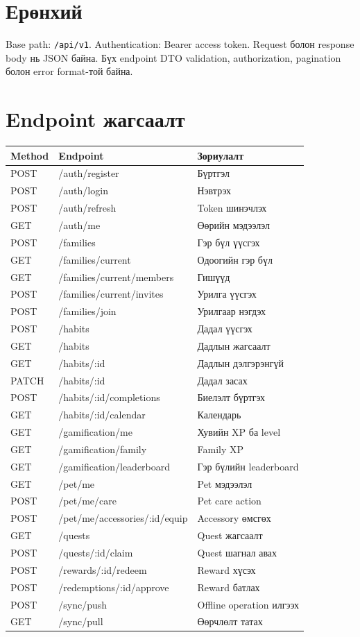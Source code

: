 \documentclass[12pt,a4paper,oneside]{report}
\begin{document}
\section{Ерөнхий}
Base path: \texttt{/api/v1}. Authentication: Bearer access token. Request болон response body нь JSON байна. Бүх endpoint DTO validation, authorization, pagination болон error format-той байна.

\section{Endpoint жагсаалт}
\begin{longtable}{p{}p{}p{}}
\toprule
\textbf{Method} & \textbf{Endpoint} & \textbf{Зориулалт}\\
\midrule
POST & /auth/register & Бүртгэл\\
POST & /auth/login & Нэвтрэх\\
POST & /auth/refresh & Token шинэчлэх\\
GET & /auth/me & Өөрийн мэдээлэл\\
POST & /families & Гэр бүл үүсгэх\\
GET & /families/current & Одоогийн гэр бүл\\
GET & /families/current/members & Гишүүд\\
POST & /families/current/invites & Урилга үүсгэх\\
POST & /families/join & Урилгаар нэгдэх\\
POST & /habits & Дадал үүсгэх\\
GET & /habits & Дадлын жагсаалт\\
GET & /habits/:id & Дадлын дэлгэрэнгүй\\
PATCH & /habits/:id & Дадал засах\\
POST & /habits/:id/completions & Биелэлт бүртгэх\\
GET & /habits/:id/calendar & Календарь\\
GET & /gamification/me & Хувийн XP ба level\\
GET & /gamification/family & Family XP\\
GET & /gamification/leaderboard & Гэр бүлийн leaderboard\\
GET & /pet/me & Pet мэдээлэл\\
POST & /pet/me/care & Pet care action\\
POST & /pet/me/accessories/:id/equip & Accessory өмсгөх\\
GET & /quests & Quest жагсаалт\\
POST & /quests/:id/claim & Quest шагнал авах\\
POST & /rewards/:id/redeem & Reward хүсэх\\
POST & /redemptions/:id/approve & Reward батлах\\
POST & /sync/push & Offline operation илгээх\\
GET & /sync/pull & Өөрчлөлт татах\\
\bottomrule
\end{longtable}
\end{document}

